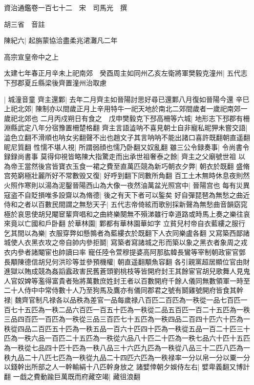 資治通鑑卷一百七十二　宋　司馬光　撰

胡三省　音註

陳紀六|{
	起旃蒙協洽盡柔兆涒灘凡二年}


高宗宣皇帝中之上

太建七年春正月辛未上祀南郊　癸酉周主如同州乙亥左衛將軍樊毅克潼州|{
	五代志下邳郡夏丘縣梁後齊置潼州治取慮}


|{
	城潼音童}
齊主還鄴|{
	去年二月齊主如晉陽討思好尋已還鄴八月復如晉陽今還}
辛巳上祀北郊|{
	陳制亦以間歲正月上辛用特牛一祀天地於南北二郊間歲者一歲祀南郊一歲祀北郊也}
二月丙戍朔日有食之　戊申樊毅克下邳高柵等六城|{
	地形志下邳郡有柵淵縣武定八年分宿豫置柵楚格翻}
齊主言語澁呐不喜見朝士自非寵私昵狎未嘗交語|{
	澁色立翻不滑順也呐女劣翻聲不出也趙文子其言呐呐不能出諸口喜許既翻朝直遥翻昵尼質翻}
性懦不堪人視|{
	所謂弱顔也懦乃卧翻又奴亂翻}
雖三公令録奏事|{
	令尚書令録録尚書事}
莫得仰視皆略陳大指驚走而出承世祖奢泰之餘|{
	齊主之父廟號世祖}
以為帝王當然後宫皆寶衣玉食一裙之費至直萬匹競為新巧朝衣夕弊|{
	朝衣於既翻}
盛脩宫苑窮極壯麗所好不常數毁又復|{
	好呼到翻下同數所角翻}
百工土木無時休息夜則然火照作寒則以湯為泥鑿晉陽西山為大像一夜然油萬盆光照宫中|{
	晉陽宫也}
每有災異寇盗不自貶損唯多設齋以為脩德|{
	後之有天下者可以鍳矣}
好自彈琵琶為無愁之曲近侍和之者以百數民間謂之無愁天子|{
	五代志帝倚絃而歌别採新聲為無愁曲音韻窈窕極於哀思使胡兒閹䆠輩齊唱和之曲終樂闋無不殞涕雖行幸道路或時馬上奏之樂往哀來竟以亡國和戶卧翻}
於華林園|{
	鄴都有華林園華如字}
立貧兒村帝自衣藍縷之服行乞其間以為樂|{
	衣服穿弊如懸鶉者為藍縷衣於既翻下人衣同樂盧各翻}
又寫築西鄙諸城使人衣黑衣攻之帝自帥内參拒鬬|{
	寫築者寫諸城之形而築以象之黑衣者象周之戎衣内參者諸閹宦也帥讀曰率}
寵任陸令萱穆提婆高阿那肱韓長鸞等宰制朝政宦官鄧長顒陳德信胡兒何洪珍等並參預機權|{
	朝直遥翻顒魚容翻}
各引親黨超居顯位官由財進獄以賄成競為姦謟蠧政害民舊蒼頭劉桃枝等皆開府封王其餘宦官胡兒歌舞人見鬼人官奴婢等濫得富貴者殆將萬數庶姓封王者以百數開府千餘人儀同無數領軍一時至二十人侍中中常侍數十人乃至狗馬及鷹亦有儀同郡君之號有鬬雞號開府皆食其幹禄|{
	魏齊官制凡禄各以品秩為差官一品每歲禄八百匹二百匹為一秩從一品七百匹一百七十五匹為一秩二品六百匹一百五十匹為一秩從二品五百匹一百二十五匹為一秩三品四百匹一百匹為一秩從三品三百匹七十五匹為一秩四品二百四十匹六十匹為一秩從四品二百匹五十匹為一秩五品一百六十匹四十匹為一秩從五品一百二十匹三十匹為一秩六品一百匹二十五匹為一秩從六品八十匹二十匹為一秩七品六十匹十五匹為一秩從七品四十匹十匹為一秩八品三十六匹九匹為一秩從八品三十二匹八匹為一秩九品二十八匹七匹為一秩從九品二十四匹六匹為一秩禄率一分以帛一分以粟一分以錢幹出所部之人一幹輸絹十八匹幹身放之}
諸嬖倖朝夕娛侍左右|{
	嬖卑義翻又博計翻}
一戱之費動踰巨萬既而府藏空竭|{
	藏徂浪翻}

